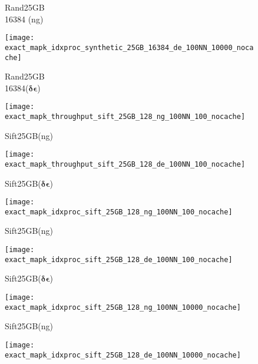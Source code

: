 {{\begin{figure*}[!htb]
\begin{subfigure}{0.16\textwidth}
		\scriptsize \caption{Rand25GB\\16384 (ng)} 
		\label{fig:approx:accuracy:efficiency:synthetic:25GB:16384:ng:hdd:100NN:10K:nocache}
	\end{subfigure}
	\begin{subfigure}{0.16\textwidth}
		\centering
		\texttt{[image: exact\_mapk\_idxproc\_synthetic\_25GB\_16384\_de\_100NN\_10000\_nocache]}
		\scriptsize \caption{Rand25GB\\16384($\bm{\delta\epsilon}$)} 
		\label{fig:approx:accuracy:efficiency:synthetic:25GB:16384:de:hdd:100NN:10K:nocache}
	\end{subfigure}
	\begin{subfigure}{0.16\textwidth}
		\centering
		\texttt{[image: exact\_mapk\_throughput\_sift\_25GB\_128\_ng\_100NN\_100\_nocache]}
		\scriptsize \caption{Sift25GB(ng)} 
		\label{fig:approx:accuracy:qefficiency:sift:25GB:ng:hdd:100NN:100:nocache}
	\end{subfigure}
	\begin{subfigure}{0.16\textwidth}
		\centering
		\texttt{[image: exact\_mapk\_throughput\_sift\_25GB\_128\_de\_100NN\_100\_nocache]}
		\scriptsize \caption{Sift25GB($\bm{\delta\epsilon}$)} 
		\label{fig:approx:accuracy:qefficiency:sift:25GB:de:hdd:100NN:100:nocache}
	\end{subfigure}
	\begin{subfigure}{0.16\textwidth}
		\centering
		\texttt{[image: exact\_mapk\_idxproc\_sift\_25GB\_128\_ng\_100NN\_100\_nocache]}
		\scriptsize \caption{Sift25GB(ng)} 
		\label{fig:approx:accuracy:efficiency:sift:25GB:ng:hdd:100NN:100:nocache}
	\end{subfigure}
	\begin{subfigure}{0.16\textwidth}
		\centering
		\texttt{[image: exact\_mapk\_idxproc\_sift\_25GB\_128\_de\_100NN\_100\_nocache]}
		\scriptsize \caption{Sift25GB($\bm{\delta\epsilon}$)} 
		\label{fig:approx:accuracy:efficiency:sift:25GB:de:hdd:100NN:100:nocache}
	\end{subfigure}
	\begin{subfigure}{0.16\textwidth}
		\centering
		\texttt{[image: exact\_mapk\_idxproc\_sift\_25GB\_128\_ng\_100NN\_10000\_nocache]}
		\scriptsize \caption{Sift25GB(ng)} 
		\label{fig:approx:accuracy:efficiency:sift:25GB:ng:hdd:100NN:10K:nocache}
	\end{subfigure}
	\begin{subfigure}{0.16\textwidth}
		\centering
		\texttt{[image: exact\_mapk\_idxproc\_sift\_25GB\_128\_de\_100NN\_10000\_nocache]}

\end{subfigure}
\end{figure*}}}
